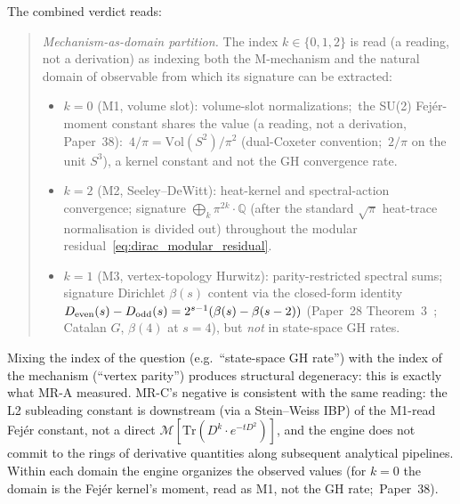 \documentclass[aps,pra,twocolumn,superscriptaddress,longbibliography]{revtex4-2}
\begin{document}
The combined verdict reads:

\begin{quote}
\textit{Mechanism-as-domain partition.}
The index $k \in \{0, 1, 2\}$ is read (a reading, not a
derivation) as indexing both the M-mechanism and the natural domain of
observable from which its signature can be extracted:
\begin{itemize}
  \item $k = 0$ (M1, volume slot): volume-slot normalizations;\ the
    SU(2) Fej{\'e}r-moment constant shares the value (a reading, not a
    derivation, Paper~38):\ $4/\pi = \mathrm{Vol}(S^2)/\pi^2$
    (dual-Coxeter convention;\ $2/\pi$ on the unit $S^3$), a kernel
    constant and not the GH convergence rate.
  \item $k = 2$ (M2, Seeley--DeWitt): heat-kernel and spectral-action
    convergence; signature $\bigoplus_k \pi^{2k}\cdot\mathbb{Q}$ (after
    the standard $\sqrt{\pi}$ heat-trace normalisation is divided out)
    throughout the modular residual~\eqref{eq:dirac_modular_residual}.
  \item $k = 1$ (M3, vertex-topology Hurwitz): parity-restricted
    spectral sums; signature Dirichlet $\beta(s)$
    content via the closed-form identity
    $D_{\rm even}(s) - D_{\rm odd}(s) = 2^{s-1}(\beta(s) - \beta(s-2))$
    (Paper~28 Theorem~3~\cite{loutey_paper28}; Catalan $G$, $\beta(4)$
    at $s = 4$), but \emph{not} in state-space GH rates.
\end{itemize}
\end{quote}

Mixing the index of the question (e.g.\ ``state-space GH rate'') with the
index of the mechanism (``vertex parity'') produces structural
degeneracy: this is exactly what MR-A measured. MR-C's negative is
consistent with the same reading: the L2 subleading constant is
downstream (via a Stein--Weiss IBP) of the M1-read Fej\'er constant, not a direct
$\mathcal{M}[\mathrm{Tr}(D^k \cdot e^{-tD^2})]$, and the
engine does not commit to the rings of derivative quantities along
subsequent analytical pipelines. Within each domain the engine
organizes the observed values (for $k = 0$ the domain is the Fej\'er
kernel's moment, read as M1, not the GH rate;\ Paper~38).
\end{document}
